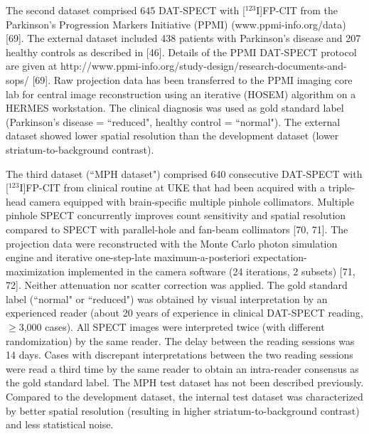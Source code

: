 The second dataset comprised 645 DAT-SPECT with [$^{123}$I]FP-CIT from the Parkinson's Progression Markers Initiative (PPMI) (www.ppmi-info.org/data) [69]. 
The external dataset included 438 patients with Parkinson's disease and 207 healthy controls as described in [46]. 
Details of the PPMI DAT-SPECT protocol are given at http://www.ppmi-info.org/study-design/research-documents-and-sops/ [69]. 
Raw projection data has been transferred to the PPMI imaging core lab for central image reconstruction using an iterative (HOSEM) algorithm on a HERMES workstation. 
The clinical diagnosis was used as gold standard label (Parkinson's disease = ``reduced", healthy control = ``normal"). 
The external dataset showed lower spatial resolution than the development dataset (lower striatum-to-background contrast).

The third dataset (``MPH dataset") comprised 640 consecutive DAT-SPECT with [$^{123}$I]FP-CIT from clinical routine at UKE that had been acquired with a triple-head camera equipped with brain-specific multiple pinhole collimators. 
Multiple pinhole SPECT concurrently improves count sensitivity and spatial resolution compared to SPECT with parallel-hole and fan-beam collimators [70, 71]. 
The projection data were reconstructed with the Monte Carlo photon simulation engine and iterative one-step-late maximum-a-posteriori expectation-maximization implemented in the camera software (24 iterations, 2 subsets) [71, 72]. 
Neither attenuation nor scatter correction was applied. 
The gold standard label (``normal" or ``reduced") was obtained by visual interpretation by an experienced reader 
(about 20 years of experience in clinical DAT-SPECT reading, $\geq$3,000 cases).
All SPECT images were interpreted twice (with different randomization) by the same reader. 
The delay between the reading sessions was 14 days. 
Cases with discrepant interpretations between the two reading sessions were read a third time by the same reader to obtain an intra-reader consensus as the gold standard label. 
The MPH test dataset has not been described previously.
Compared to the development dataset, the internal test dataset was characterized by better spatial resolution 
(resulting in higher striatum-to-background contrast) and less statistical noise. 
